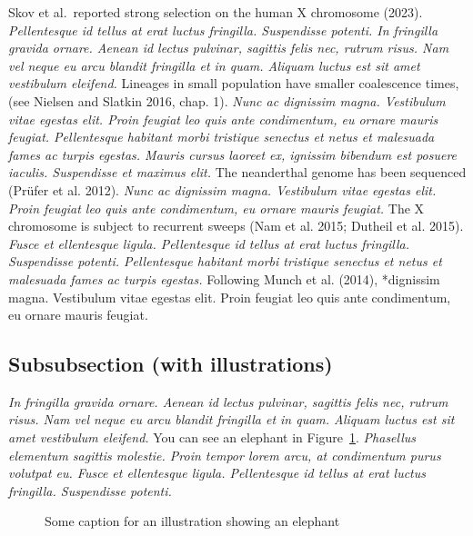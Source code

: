 \documentclass[
  a4paper,
]{scrbook}
\begin{document}
Skov et al.~reported strong selection on the human X chromosome (2023).
\emph{Pellentesque id tellus at erat luctus fringilla. Suspendisse
potenti. In fringilla gravida ornare. Aenean id lectus pulvinar,
sagittis felis nec, rutrum risus. Nam vel neque eu arcu blandit
fringilla et in quam. Aliquam luctus est sit amet vestibulum eleifend.}
Lineages in small population have smaller coalescence times, (see
Nielsen and Slatkin 2016, chap. 1). \emph{Nunc ac dignissim magna.
Vestibulum vitae egestas elit. Proin feugiat leo quis ante condimentum,
eu ornare mauris feugiat. Pellentesque habitant morbi tristique senectus
et netus et malesuada fames ac turpis egestas. Mauris cursus laoreet ex,
ignissim bibendum est posuere iaculis. Suspendisse et maximus elit.} The
neanderthal genome has been sequenced (Prüfer et al. 2012). \emph{Nunc
ac dignissim magna. Vestibulum vitae egestas elit. Proin feugiat leo
quis ante condimentum, eu ornare mauris feugiat.} The X chromosome is
subject to recurrent sweeps (Nam et al. 2015; Dutheil et al. 2015).
\emph{Fusce et ellentesque ligula. Pellentesque id tellus at erat luctus
fringilla. Suspendisse potenti. Pellentesque habitant morbi tristique
senectus et netus et malesuada fames ac turpis egestas.} Following Munch
et al. (2014), *dignissim magna. Vestibulum vitae egestas elit. Proin
feugiat leo quis ante condimentum, eu ornare mauris feugiat.

\subsection{Subsubsection (with
illustrations)}\label{subsubsection-with-illustrations}

\emph{In fringilla gravida ornare. Aenean id lectus pulvinar, sagittis
felis nec, rutrum risus. Nam vel neque eu arcu blandit fringilla et in
quam. Aliquam luctus est sit amet vestibulum eleifend.} You can see an
elephant in Figure~\ref{fig-elephant}. \emph{Phasellus elementum
sagittis molestie. Proin tempor lorem arcu, at condimentum purus
volutpat eu. Fusce et ellentesque ligula. Pellentesque id tellus at erat
luctus fringilla. Suspendisse potenti.}

\begin{figure}


\caption{\label{fig-elephant}Some caption for an illustration showing an
elephant}

\end{figure}%
\end{document}
